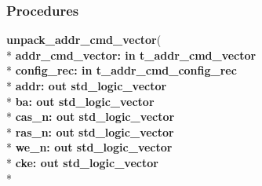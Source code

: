 \subsubsection*{Procedures}
 \begin{DoxyCompactItemize}
\item 
{\bfseries {\bfseries \textcolor{vhdlchar}{ }}} {\bf unpack\+\_\+addr\+\_\+cmd\+\_\+vector}( \\*
{\bfseries \textcolor{vhdlchar}{ }\textcolor{vhdlchar}{addr\+\_\+cmd\+\_\+vector\+: }\textcolor{stringliteral}{} {\bfseries \textcolor{keywordflow}{in}\textcolor{vhdlchar}{ }{\bfseries {\bf t\+\_\+addr\+\_\+cmd\+\_\+vector}} \textcolor{vhdlchar}{ }}}\\*
  {\bfseries \textcolor{vhdlchar}{ }\textcolor{vhdlchar}{config\+\_\+rec\+: }\textcolor{stringliteral}{} {\bfseries \textcolor{keywordflow}{in}\textcolor{vhdlchar}{ }{\bfseries {\bf t\+\_\+addr\+\_\+cmd\+\_\+config\+\_\+rec}} \textcolor{vhdlchar}{ }}}\\*
  {\bfseries \textcolor{vhdlchar}{ }\textcolor{vhdlchar}{addr\+: }\textcolor{stringliteral}{} {\bfseries \textcolor{keywordflow}{out}\textcolor{vhdlchar}{ }\textcolor{comment}{std\+\_\+logic\+\_\+vector}\textcolor{vhdlchar}{ }}}\\*
  {\bfseries \textcolor{vhdlchar}{ }\textcolor{vhdlchar}{ba\+: }\textcolor{stringliteral}{} {\bfseries \textcolor{keywordflow}{out}\textcolor{vhdlchar}{ }\textcolor{comment}{std\+\_\+logic\+\_\+vector}\textcolor{vhdlchar}{ }}}\\*
  {\bfseries \textcolor{vhdlchar}{ }\textcolor{vhdlchar}{cas\+\_\+n\+: }\textcolor{stringliteral}{} {\bfseries \textcolor{keywordflow}{out}\textcolor{vhdlchar}{ }\textcolor{comment}{std\+\_\+logic\+\_\+vector}\textcolor{vhdlchar}{ }}}\\*
  {\bfseries \textcolor{vhdlchar}{ }\textcolor{vhdlchar}{ras\+\_\+n\+: }\textcolor{stringliteral}{} {\bfseries \textcolor{keywordflow}{out}\textcolor{vhdlchar}{ }\textcolor{comment}{std\+\_\+logic\+\_\+vector}\textcolor{vhdlchar}{ }}}\\*
  {\bfseries \textcolor{vhdlchar}{ }\textcolor{vhdlchar}{we\+\_\+n\+: }\textcolor{stringliteral}{} {\bfseries \textcolor{keywordflow}{out}\textcolor{vhdlchar}{ }\textcolor{comment}{std\+\_\+logic\+\_\+vector}\textcolor{vhdlchar}{ }}}\\*
  {\bfseries \textcolor{vhdlchar}{ }\textcolor{vhdlchar}{cke\+: }\textcolor{stringliteral}{} {\bfseries \textcolor{keywordflow}{out}\textcolor{vhdlchar}{ }\textcolor{comment}{std\+\_\+logic\+\_\+vector}\textcolor{vhdlchar}{ }}}\\*

\end{DoxyCompactItemize}
